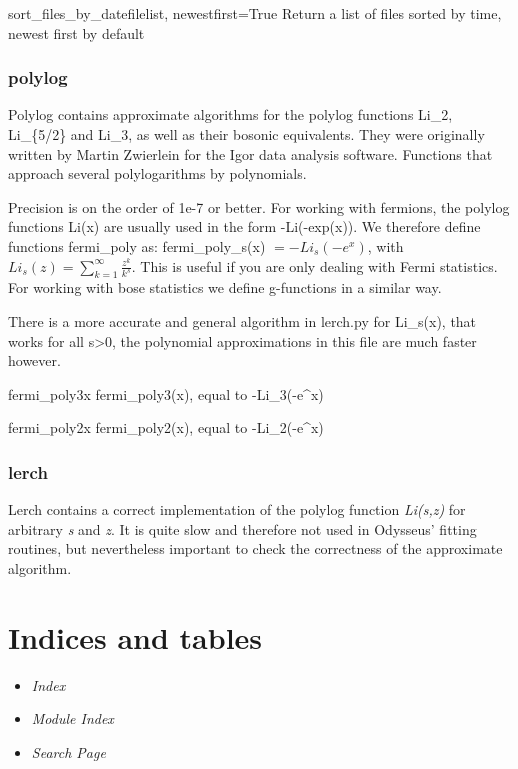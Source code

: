 \documentclass[letterpaper,10pt,english]{manual}
\begin{document}
\hypertarget{filetools.sort_files_by_date}{}\begin{funcdesc}{sort\_files\_by\_date}{filelist, newestfirst=True}
Return a list of files sorted by time, newest first by default
\end{funcdesc}


\subsection{polylog}

Polylog contains approximate algorithms for the polylog functions Li\_2, Li\_\{5/2\} and Li\_3, as well as their bosonic equivalents. They were originally written by Martin Zwierlein for the Igor data analysis software.
\modulesynopsis{}
Functions that approach several polylogarithms by polynomials.

Precision is on the order of 1e-7 or better. For working with fermions, the
polylog functions Li(x) are usually used in the form -Li(-exp(x)). We therefore
define functions fermi\_poly as:
fermi\_poly\_s(x) $=-Li_s(-e^x)$,
with $Li_s(z)=\sum_{k=1}^{\infty}\frac{z^k}{k^s}$.
This is useful if you are only dealing with Fermi statistics. For working with
bose statistics we define g-functions in a similar way.

There is a more accurate and general algorithm in lerch.py for Li\_s(x),
that works for all s\textgreater{}0, the polynomial approximations in this file are much
faster however.

\hypertarget{polylog.fermi_poly3}{}\begin{funcdesc}{fermi\_poly3}{x}
fermi\_poly3(x), equal to -Li\_3(-e\textasciicircum{}x)
\end{funcdesc}

\hypertarget{polylog.fermi_poly2}{}\begin{funcdesc}{fermi\_poly2}{x}
fermi\_poly2(x), equal to -Li\_2(-e\textasciicircum{}x)
\end{funcdesc}


\subsection{lerch}

Lerch contains a correct implementation of the polylog function \emph{Li(s,z)} for arbitrary \emph{s} and \emph{z}. It is quite slow and therefore not used in Odysseus' fitting routines, but nevertheless important to check the correctness of the approximate algorithm.


\chapter{Indices and tables}
\begin{itemize}
\item {} 
\emph{Index}

\item {} 
\emph{Module Index}

\item {} 
\emph{Search Page}

\end{itemize}


\renewcommand{\indexname}{Module Index}
\printmodindex
\renewcommand{\indexname}{Index}
\printindex
\end{document}
